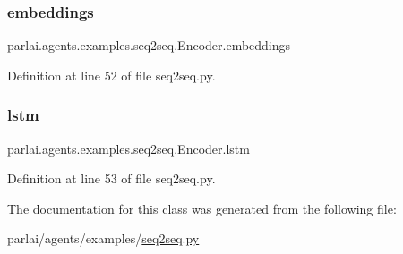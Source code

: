 \subsubsection{\texorpdfstring{embeddings}{embeddings}}
{\footnotesize\ttfamily parlai.\+agents.\+examples.\+seq2seq.\+Encoder.\+embeddings}



Definition at line 52 of file seq2seq.\+py.

\mbox{\label{classparlai_1_1agents_1_1examples_1_1seq2seq_1_1Encoder_a8dc64f513d6f124aa80ba82f18cb12f1}} 
\subsubsection{\texorpdfstring{lstm}{lstm}}
{\footnotesize\ttfamily parlai.\+agents.\+examples.\+seq2seq.\+Encoder.\+lstm}



Definition at line 53 of file seq2seq.\+py.



The documentation for this class was generated from the following file\+:\begin{DoxyCompactItemize}
\item 
parlai/agents/examples/\hyperlink{agents_2examples_2seq2seq_8py}{seq2seq.\+py}\end{DoxyCompactItemize}
